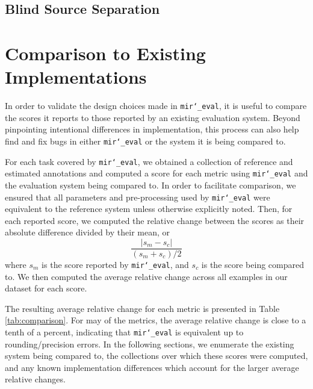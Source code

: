\documentclass{article}
\def\mireval{\texttt{mir\char`_eval}}
\begin{document}
\subsection{Blind Source Separation}


\section{Comparison to Existing Implementations}
\label{sec:comparison}

In order to validate the design choices made in \mireval{}, it is useful to compare the scores it reports to those reported by an existing evaluation system.
Beyond pinpointing intentional differences in implementation, this process can also help find and fix bugs in either \mireval{} or the system it is being compared to.

For each task covered by \mireval{}, we obtained a collection of reference and estimated annotations and computed a score for each metric using \mireval{} and the evaluation system being compared to.
In order to facilitate comparison, we ensured that all parameters and pre-processing used by \mireval{} were equivalent to the reference system unless otherwise explicitly noted.
Then, for each reported score, we computed the relative change between the scores as their absolute difference divided by their mean, or
$$
\frac{|s_m - s_c|}{(s_m + s_c)/2}
$$
where $s_m$ is the score reported by \mireval{}, and $s_c$ is the score being compared to.
We then computed the average relative change across all examples in our dataset for each score.

The resulting average relative change for each metric is presented in Table \ref{tab:comparison}.
For may of the metrics, the average relative change is close to a tenth of a percent, indicating that \mireval{} is equivalent up to rounding/precision errors.
In the following sections, we enumerate the existing system being compared to, the collections over which these scores were computed, and any known implementation differences which account for the larger average relative changes.



\end{document}
